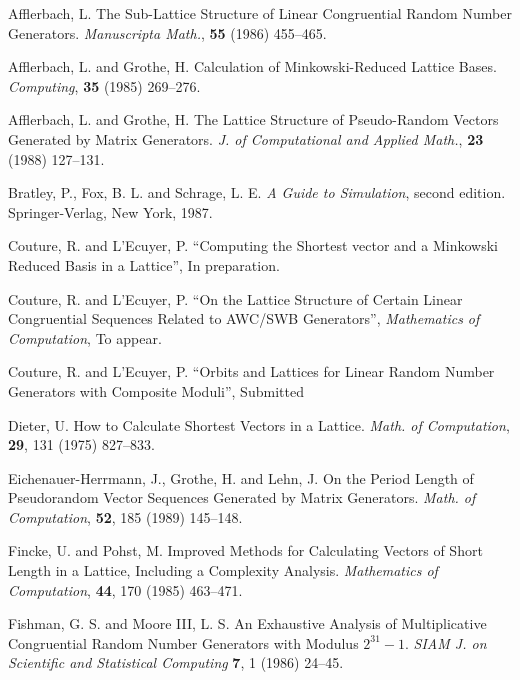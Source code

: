 \iffalse %
\begin {refer}

 Afflerbach, L.
The Sub-Lattice Structure of Linear Congruential Random Number Generators.
{\it Manuscripta Math.\/}, {\bf 55} (1986) 455--465.

 Afflerbach, L. and Grothe, H.
Calculation of Minkowski-Reduced Lattice Bases.
{\it Computing\/}, {\bf 35} (1985) 269--276.

 Afflerbach, L. and Grothe, H.
The Lattice Structure of Pseudo-Random Vectors Generated by Matrix Generators.
{\it J. of Computational and Applied Math.\/}, {\bf 23} (1988) 127--131.

 Bratley, P., Fox, B. L. and Schrage, L. E.
{\it A Guide to Simulation\/}, second edition. Springer-Verlag, New York, 1987.

 Couture, R. and L'Ecuyer, P.
``Computing the Shortest vector and a Minkowski Reduced Basis in a Lattice'',
In preparation.

 Couture, R. and L'Ecuyer, P.
``On the Lattice Structure of Certain Linear Congruential Sequences
Related to AWC/SWB Generators'',
{\em Mathematics of Computation\/}, To appear.

 Couture, R. and L'Ecuyer, P.
``Orbits and Lattices for Linear Random Number Generators with 
Composite Moduli'', Submitted

 Dieter, U.  How to Calculate Shortest Vectors in a Lattice.
{\it Math. of Computation\/}, {\bf 29}, 131 (1975) 827--833.


 Eichenauer-Herrmann, J., Grothe, H. and Lehn, J.
On the Period Length of Pseudorandom Vector Sequences Generated by
Matrix Generators.
{\it Math. of Computation\/}, {\bf 52}, 185 (1989) 145--148.

 Fincke, U. and Pohst, M.
Improved Methods for Calculating Vectors of Short Length in a Lattice,
Including a Complexity Analysis.
{\em Mathematics of Computation}, {\bf 44}, 170 (1985) 463--471.

 Fishman, G. S. and Moore III, L. S.
An Exhaustive Analysis of
Multiplicative Congruential Random Number Generators with Modulus $2^{31}-1$.
{\it SIAM J. on Scientific and Statistical Computing\/} {\bf 7}, 1 (1986)
24--45.


\end{refer}
